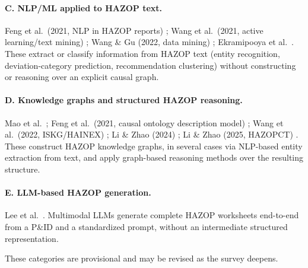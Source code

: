 \paragraph{C. NLP/ML applied to HAZOP text.}
Feng et al.\ (2021, NLP in HAZOP reports) \cite{feng2021nlphazop}; Wang et al.\ (2021, active learning/text mining) \cite{wang2021activelearning}; Wang \& Gu (2022, data mining) \cite{wanggu2022datamining}; Ekramipooya et al.\ \cite{ekramipooya2023deviation,ekramipooya2024recommendation}. These extract or classify information from HAZOP text (entity recognition, deviation-category prediction, recommendation clustering) without constructing or reasoning over an explicit causal graph.

\paragraph{D. Knowledge graphs and structured HAZOP reasoning.}
Mao et al.\ \cite{mao2020processsafetykg}; Feng et al.\ (2021, causal ontology description model) \cite{feng2021hazopcausal}; Wang et al.\ (2022, ISKG/HAINEX) \cite{wang2022iskghainex}; Li \& Zhao (2024) \cite{lizhao2024constructing}; Li \& Zhao (2025, HAZOPCT) \cite{lizhao2025hazopct}. These construct HAZOP knowledge graphs, in several cases via NLP-based entity extraction from text, and apply graph-based reasoning methods over the resulting structure.

\paragraph{E. LLM-based HAZOP generation.}
Lee et al.\ \cite{lee2026llmhazop}. Multimodal LLMs generate complete HAZOP worksheets end-to-end from a P\&ID and a standardized prompt, without an intermediate structured representation.

These categories are provisional and may be revised as the survey deepens.

